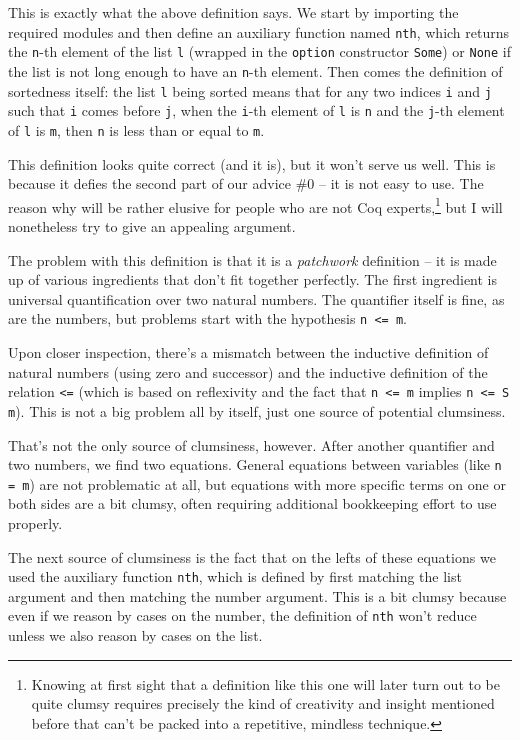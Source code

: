 \documentclass[declaration,mgr,english,shortabstract]{iithesis}
\newcommand{\m}[1]{\texttt{#1}}
\begin{document}
This is exactly what the above definition says. We start by importing the required modules and then define an auxiliary function named \m{nth}, which returns the \m{n}-th element of the list \m{l} (wrapped in the \m{option} constructor \m{Some}) or \m{None} if the list is not long enough to have an \m{n}-th element. Then comes the definition of sortedness itself: the list \m{l} being sorted means that for any two indices \m{i} and \m{j} such that \m{i} comes before \m{j}, when the \m{i}-th element of \m{l} is \m{n} and the \m{j}-th element of \m{l} is \m{m}, then \m{n} is less than or equal to \m{m}.

This definition looks quite correct (and it is), but it won't serve us well. This is because it defies the second part of our advice \#0 -- it is not easy to use. The reason why will be rather elusive for people who are not Coq experts,\footnote{Knowing at first sight that a definition like this one will later turn out to be quite clumsy requires precisely the kind of creativity and insight mentioned before that can't be packed into a repetitive, mindless technique.} but I will nonetheless try to give an appealing argument.

The problem with this definition is that it is a \textit{patchwork} definition -- it is made up of various ingredients that don't fit together perfectly. The first ingredient is universal quantification over two natural numbers. The quantifier itself is fine, as are the numbers, but problems start with the hypothesis \m{n <= m}.

Upon closer inspection, there's a mismatch between the inductive definition of natural numbers (using zero and successor) and the inductive definition of the relation \m{<=} (which is based on reflexivity and the fact that \m{n <= m} implies \m{n <= S m}). This is not a big problem all by itself, just one source of potential clumsiness.


That's not the only source of clumsiness, however. After another quantifier and two numbers, we find two equations. General equations between variables (like \m{n = m}) are not problematic at all, but equations with more specific terms on one or both sides are a bit clumsy, often requiring additional bookkeeping effort to use properly.

The next source of clumsiness is the fact that on the lefts of these equations we used the auxiliary function \m{nth}, which is defined by first matching the list argument and then matching the number argument. This is a bit clumsy because even if we reason by cases on the number, the definition of \m{nth} won't reduce unless we also reason by cases on the list.
\end{document}
